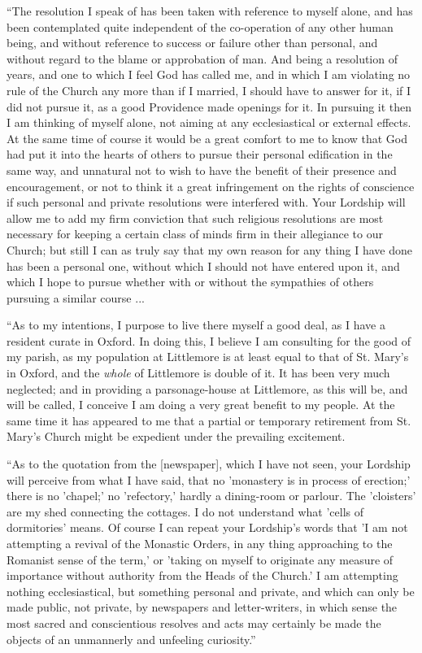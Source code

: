 ``The resolution I speak of has been taken with reference to
myself alone, and has been contemplated quite independent of the
co-operation of any other human being, and without reference to success
or failure other than personal, and without regard to the blame or
approbation of man. And being a resolution of years, and one to
which I feel God has called me, and in which I am violating no rule of
the Church any more than if I married, I should have to answer for it,
if I did not pursue it, as a good Providence made openings for it. In
pursuing it then I am thinking of myself alone, not aiming at any
ecclesiastical or external effects. At the same time of course it would
be a great comfort to me to know that God had put it into the hearts of
others to pursue their personal edification in the same way, and
unnatural not to wish to have the benefit of their presence and
encouragement, or not to think it a great infringement on the rights of
conscience if such personal and private resolutions were interfered
with. Your Lordship will allow me to add my firm conviction that such
religious resolutions are most necessary for keeping a certain class of
minds firm in their allegiance to our Church; but still I can as truly
say that my own reason for any thing I have done has been a personal
one, without which I should not have entered upon it, and which I hope
to pursue whether with or without the sympathies of others pursuing a
similar course ...

``As to my intentions, I purpose to live there myself a good
deal, as I have a resident curate in Oxford. In doing this, I believe I
am consulting for the good of my parish, as my population at Littlemore
is at least equal to that of St. Mary's in Oxford, and the \emph{whole}
of Littlemore is double of it. It has been very much neglected; and in
providing a parsonage-house at Littlemore, as this will be, and will be
called, I conceive I am doing a very great benefit to my people. At the
same time it has appeared to me that a partial or temporary retirement
from St. Mary's Church might be expedient under the prevailing
excitement.

``As to the quotation from the [newspaper], which I have not
seen, your Lordship will perceive from what I have said, that no
'monastery is in process of erection;' there is no 'chapel;' no
'refectory,' hardly a dining-room or parlour. The 'cloisters' are my
shed connecting the cottages. I do not understand what 'cells of
dormitories' means. Of course I can repeat your Lordship's words
that 'I am not attempting a revival of the Monastic Orders, in any thing
approaching to the Romanist sense of the term,' or 'taking on myself to
originate any measure of importance without authority from the Heads of
the Church.' I am attempting nothing ecclesiastical, but something
personal and private, and which can only be made public, not private, by
newspapers and letter-writers, in which sense the most sacred and
conscientious resolves and acts may certainly be made the objects of an
unmannerly and unfeeling curiosity.''

